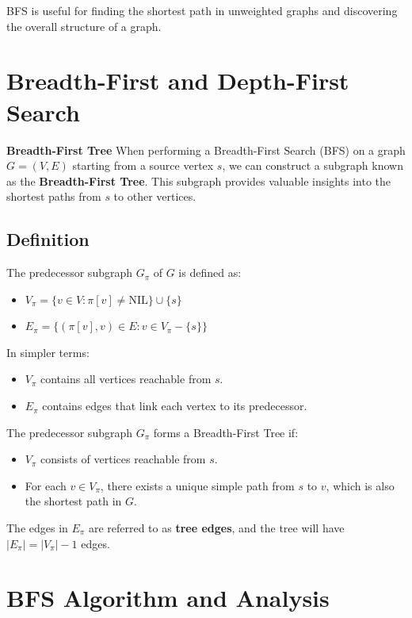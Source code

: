 BFS is useful for finding the shortest path in unweighted graphs and discovering the overall structure of a graph.


\section{Breadth-First and Depth-First Search}

\textbf{Breadth-First Tree}
When performing a Breadth-First Search (BFS) on a graph $G = (V, E)$ starting from a source vertex $s$, we can construct a subgraph known as the \textbf{Breadth-First Tree}. This subgraph provides valuable insights into the shortest paths from $s$ to other vertices.

\subsection{Definition}
The predecessor subgraph $G_\pi$ of $G$ is defined as:
\begin{itemize}
    \item $V_\pi = \{v \in V : \pi[v] \neq \text{NIL}\} \cup \{s\}$
    \item $E_\pi = \{(\pi[v], v) \in E : v \in V_\pi - \{s\} \}$
\end{itemize}
In simpler terms:
\begin{itemize}
    \item $V_\pi$ contains all vertices reachable from $s$.
    \item $E_\pi$ contains edges that link each vertex to its predecessor.
\end{itemize}
The predecessor subgraph $G_\pi$ forms a Breadth-First Tree if:
\begin{itemize}
    \item $V_\pi$ consists of vertices reachable from $s$.
    \item For each $v \in V_\pi$, there exists a unique simple path from $s$ to $v$, which is also the shortest path in $G$.
\end{itemize}
The edges in $E_\pi$ are referred to as \textbf{tree edges}, and the tree will have $|E_\pi| = |V_\pi| - 1$ edges.

\section{BFS Algorithm and Analysis}
